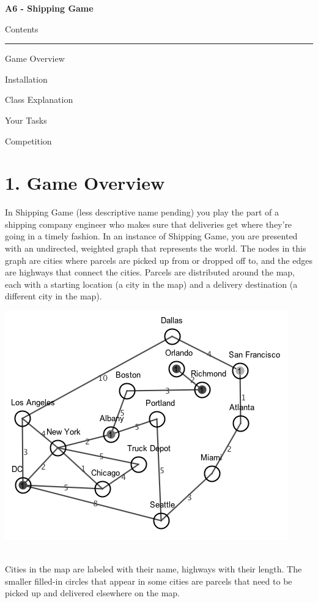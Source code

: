 \documentclass[11pt]{article}
\begin{document}
\begin{center}
\begin{HUGE}{\bf A6 - Shipping Game}\\ \end{HUGE}
\vspace{10mm}
\begin{LARGE} Contents\\ \end{LARGE}
\noindent\rule{8cm}{0.4pt}
\begin{enumerate} \begin{large}
\item Game Overview
\item Installation
\item Class Explanation
\item Your Tasks
\item Competition
\end{large}\end{enumerate}
\end{center}
\newpage

\section{1. Game Overview}
In Shipping Game (less descriptive name pending) you play the part of a shipping company engineer who makes sure that deliveries get where they're going in a timely fashion. In an instance of Shipping Game, you are presented with an undirected, weighted graph that represents the world. The nodes in this graph are cities where parcels are picked up from or dropped off to, and the edges are highways that connect the cities. Parcels are distributed around the map, each with a starting location (a city in the map) and a delivery destination (a different city in the map).\\
\centerline{\includegraphics[scale=0.8]{map1.png}}\\
Cities in the map are labeled with their name, highways with their length. The smaller filled-in circles that appear in some cities are parcels that need to be picked up and delivered elsewhere on the map.\\
\end{document}

